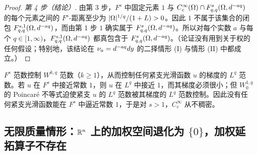 \begin{proof}
\emph{第 4 步（结论）}. 由第 3 步，$F^s$ 中固定元素 $1$ 与 $C_c^\infty(\Omega)\cap F^{s}_{q,q}(\Omega,d^{-aq})$ 的每个元素之间的 $F^s$-距离至少为 $|\Omega|^{1/q}/(1+L)>0$。因此 $1$ 不属于该集合的闭包 $F^{s,1}_{q,q}(\Omega,d^{-aq})$，而由第 1 步 $1$ 确实属于 $F^{s}_{q,q}(\Omega,d^{-aq})$。所以对每个实数 $a$ 与每个 $q\in[1,\infty)$，$F^{s,1}_{q,q}(\Omega,d^{-aq})$ 都真包含于 $F^{s}_{q,q}(\Omega,d^{-aq})$。（论证没有用到关于权的任何假设；特别地，该结论在 $\nu_{a}=d^{-aq}dy$ 的二择情形 (I) 与情形 (II) 中都成立。）
\end{proof}

\begin{remark}[直觉]
$F^s$ 范数控制 $W^{k,q}$ 范数（$k\ge1$），从而控制任何紧支光滑函数 $u$ 的梯度的 $L^q$ 范数。若 $u$ 在 $F^s$ 中接近常数 $1$，则 $u$ 在 $L^q$ 中接近 $1$，而其梯度必须很小；但 $W^{1,q}_0$ 的 Poincar\'e 不等式迫使紧支 $u$ 的 $L^q$ 范数被其梯度的 $L^q$ 范数控制。因此没有任何紧支光滑函数能在 $F^s$ 中逼近常数 $1$，于是对 $s>1$，$C_c^\infty$ 从不稠密。
\end{remark}

\subsection{无限质量情形：\texorpdfstring{$\mathbb{R}^n$}{Rn} 上的加权空间退化为 \texorpdfstring{$\{0\}$}{0}，加权延拓算子不存在}

